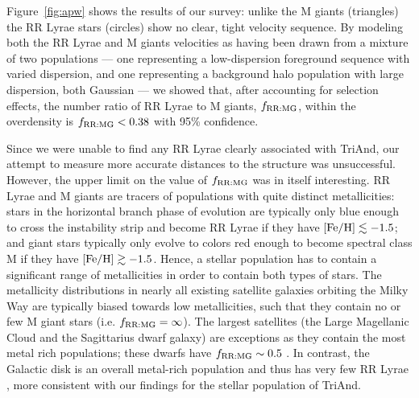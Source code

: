 \documentclass[galaxies,article,submit,moreauthors,pdftex,10pt,a4paper]{mdpi}
\newcommand{\frrmg}{\ensuremath{f_{\rm RR:MG}}}
\newcommand{\feh}{\ensuremath{[{\rm Fe}/{\rm H}]}}
\begin{document}
Figure~\ref{fig:apw} \cite[reproduced from][]{pricewhelan15} shows the results
of our survey: unlike the M giants (triangles) the RR Lyrae stars (circles) show
no clear, tight velocity sequence.
By modeling both the RR Lyrae and M giants velocities as having been drawn from
a mixture of two populations --- one representing a low-dispersion foreground
sequence with varied dispersion, and one representing a background halo
population with large dispersion, both Gaussian --- we showed that, after
accounting for selection effects, the number ratio of RR Lyrae to M giants, \frrmg, within the overdensity is $\frrmg < 0.38$ with 95\% confidence.


Since we were unable to find any RR Lyrae clearly associated with TriAnd, our
attempt to measure more accurate distances to the structure was unsuccessful.
However, the upper limit on the value of $\frrmg$ was in itself interesting.
RR Lyrae and M giants are tracers of populations with quite distinct
metallicities: stars in the horizontal branch phase of evolution are typically
only blue enough to cross the instability strip and become RR Lyrae if they have
$\feh \lesssim -1.5$; and giant stars typically only evolve to colors red enough
to become spectral class M if they have $\feh \gtrsim -1.5$.
Hence, a stellar population has to contain a significant range of metallicities
in order to contain both types of stars.
The metallicity distributions in nearly all existing satellite galaxies
orbiting the Milky Way \cite[e.g.,][]{kirby11} are typically biased towards
low metallicities, such that they contain no or few M giant stars (i.e. $\frrmg = \infty$).
The largest satellites (the Large Magellanic Cloud and the Sagittarius dwarf galaxy) are exceptions as they contain the most metal rich populations; these dwarfs have $\frrmg \sim 0.5$ \cite{pricewhelan15}.
In contrast, the Galactic disk is an overall metal-rich population and thus has very few RR Lyrae \cite[i.e. $\frrmg \sim 0$;][]{amrose01}, more consistent with our findings for the stellar population of TriAnd.
\end{document}
